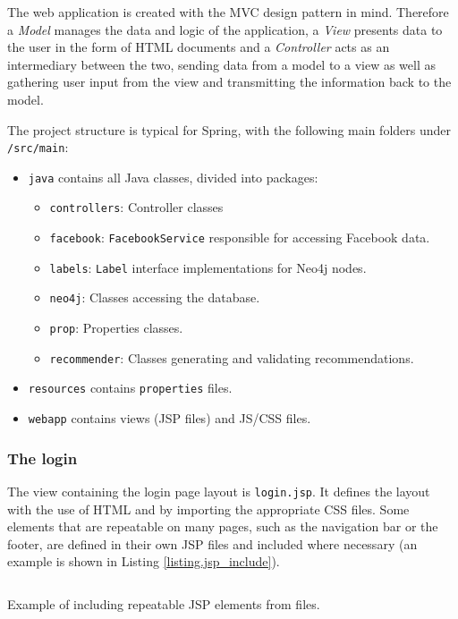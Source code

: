 \documentclass[12pt]{report}
\begin{document}
The web application is created with the MVC design pattern in mind. Therefore a \textit{Model} manages the data and logic of the application, a \textit{View} presents data to the user in the form of HTML documents and a \textit{Controller} acts as an intermediary between the two, sending data from a model to a view as well as gathering user input from the view and transmitting the information back to the model.

The project structure is typical for Spring, with the following main folders under \texttt{/src/main}:
\begin{itemize}
\item \texttt{java} contains all Java classes, divided into packages:
    \begin{itemize}
    \item \texttt{controllers}: Controller classes
    \item \texttt{facebook}: \texttt{FacebookService} responsible for accessing Facebook data.
    \item \texttt{labels}: \texttt{Label} interface implementations for Neo4j nodes.
    \item \texttt{neo4j}: Classes accessing the database.
    \item \texttt{prop}: Properties classes.
    \item \texttt{recommender}: Classes generating and validating recommendations.
    \end{itemize}
\item \texttt{resources} contains \texttt{properties} files.
\item \texttt{webapp} contains views (JSP files) and JS/CSS files.
\end{itemize}


\subsubsection{The login}

The view containing the login page layout is \texttt{login.jsp}. It defines the layout with the use of HTML and by importing the appropriate CSS files. Some elements that are repeatable on many pages, such as the navigation bar or the footer, are defined in their own JSP files and included where necessary (an example is shown in Listing \ref{listing.jsp_include}).

\begin{listing}
\inputminted[framesep=3mm,fontsize=\footnotesize,bgcolor=gray!20]{jsp}{code_jsp_include.jsp}
\caption{Example of including repeatable JSP elements from files.}
\label{listing.jsp_include}
\end{listing}
\end{document}
